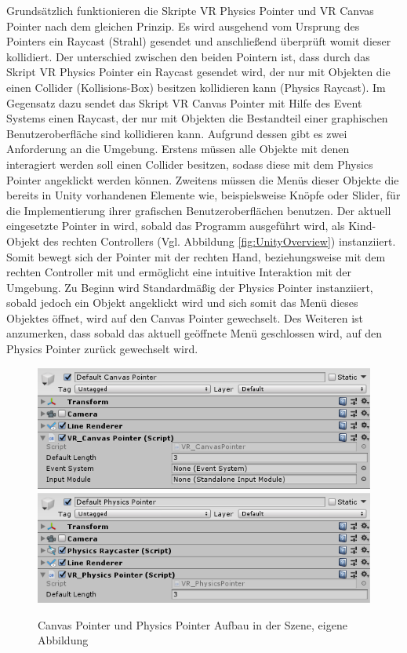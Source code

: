 \newline
Grundsätzlich funktionieren die Skripte VR Physics Pointer und VR Canvas Pointer nach dem gleichen Prinzip. Es wird ausgehend vom Ursprung des Pointers ein Raycast (Strahl) gesendet und anschließend überprüft womit dieser kollidiert. Der unterschied zwischen den beiden Pointern ist, dass durch das Skript VR Physics Pointer ein Raycast gesendet wird, der nur mit Objekten die einen Collider (Kollisions-Box) besitzen kollidieren kann (Physics Raycast). Im Gegensatz dazu sendet das Skript VR Canvas Pointer mit Hilfe des Event Systems einen Raycast, der nur mit Objekten die Bestandteil einer graphischen Benutzeroberfläche sind kollidieren kann. Aufgrund dessen gibt es zwei Anforderung an die Umgebung. Erstens müssen alle Objekte mit denen interagiert werden soll einen Collider besitzen, sodass diese mit dem Physics Pointer angeklickt werden können. Zweitens müssen die Menüs dieser Objekte die bereits in Unity vorhandenen Elemente wie, beispielsweise Knöpfe oder Slider, für die Implementierung ihrer grafischen Benutzeroberflächen benutzen.
\newline
Der aktuell eingesetzte Pointer in wird, sobald das Programm ausgeführt wird, als Kind-Objekt des rechten Controllers (Vgl. Abbildung \ref{fig:UnityOverview}) instanziiert. Somit bewegt sich der Pointer mit der rechten Hand, beziehungsweise mit dem rechten Controller mit und ermöglicht eine intuitive Interaktion mit der Umgebung. Zu Beginn wird Standardmäßig der Physics Pointer instanziiert, sobald jedoch ein Objekt angeklickt wird und sich somit das Menü dieses Objektes öffnet, wird auf den Canvas Pointer gewechselt. Des Weiteren ist anzumerken, dass sobald das aktuell geöffnete Menü geschlossen wird, auf den Physics Pointer zurück gewechselt wird.
\begin{figure}[h]
	\centering
	\includegraphics[width=0.49\linewidth]{Bilder/A42_CanvasPointer}
	\includegraphics[width=0.49\linewidth]{Bilder/A43_PhysicsPointer}
	\caption{Canvas Pointer und Physics Pointer Aufbau in der Szene, eigene Abbildung}
	\label{fig:Pointer}
\end{figure}
